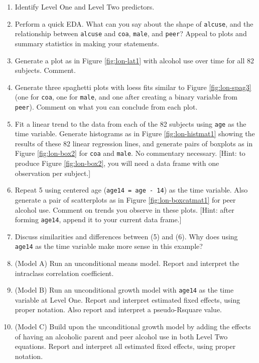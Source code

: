 \documentclass[
]{krantz}
\providecommand{\tightlist}{%
  \setlength{\itemsep}{0pt}\setlength{\parskip}{0pt}}
\begin{document}
\begin{enumerate}
  \begin{enumerate}
  \def\labelenumii{\arabic{enumii}.}
  \tightlist
  \item
    Identify Level One and Level Two predictors.
  \item
    Perform a quick EDA. What can you say about the shape of \texttt{alcuse}, and the relationship between \texttt{alcuse} and \texttt{coa}, \texttt{male}, and \texttt{peer}? Appeal to plots and summary statistics in making your statements.
  \item
    Generate a plot as in Figure \ref{fig:lon-lat1} with alcohol use over time for all 82 subjects. Comment.
  \item
    Generate three spaghetti plots with loess fits similar to Figure \ref{fig:lon-spag3} (one for \texttt{coa}, one for \texttt{male}, and one after creating a binary variable from \texttt{peer}). Comment on what you can conclude from each plot.
  \item
    Fit a linear trend to the data from each of the 82 subjects using \texttt{age} as the time variable. Generate histograms as in Figure \ref{fig:lon-histmat1} showing the results of these 82 linear regression lines, and generate pairs of boxplots as in Figure \ref{fig:lon-box2} for \texttt{coa} and \texttt{male}. No commentary necessary. {[}Hint: to produce Figure \ref{fig:lon-box2}, you will need a data frame with one observation per subject.{]}
  \item
    Repeat 5 using centered age (\texttt{age14\ =\ age\ -\ 14}) as the time variable. Also generate a pair of scatterplots as in Figure \ref{fig:lon-boxcatmat1} for peer alcohol use. Comment on trends you observe in these plots. {[}Hint: after forming \texttt{age14}, append it to your current data frame.{]}
  \item
    Discuss similarities and differences between (5) and (6). Why does using \texttt{age14} as the time variable make more sense in this example?
  \item
    (Model A) Run an unconditional means model. Report and interpret the intraclass correlation coefficient.
  \item
    (Model B) Run an unconditional growth model with \texttt{age14} as the time variable at Level One. Report and interpret estimated fixed effects, using proper notation. Also report and interpret a pseudo-Rsquare value.
  \item
    (Model C) Build upon the unconditional growth model by adding the effects of having an alcoholic parent and peer alcohol use in both Level Two equations. Report and interpret all estimated fixed effects, using proper notation.

\end{enumerate}
\end{enumerate}
\end{document}
